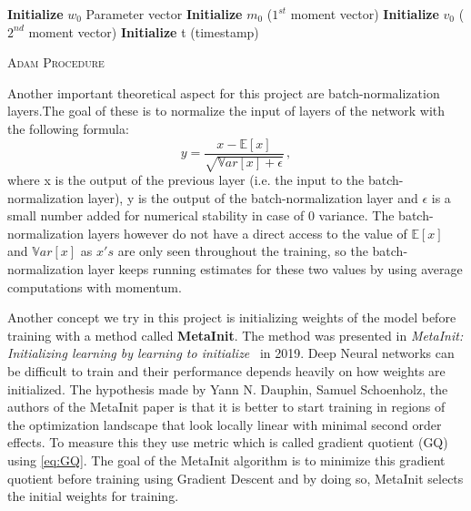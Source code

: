 \documentclass[a4paper,11pt,oneside]{report}
\begin{document}
\begin{algorithm}[H]
    \DontPrintSemicolon
    \SetAlgoNoLine
    
    \KwIn{learning rate $\eta$, exponential decay rates for the moment estimates $\beta_1, \beta_2 \in [0,1)$}
    \textbf{Initialize} $w_0$ Parameter vector\;
    \textbf{Initialize} $m_0$ ($1^{st}$ moment vector)\;
    \textbf{Initialize} $v_0$ ($2^{nd}$ moment vector)\;
    \textbf{Initialize} t (timestamp)\;
    \caption{{\textsc{Adam Procedure}}}
    \label{algo:Adam}
\end{algorithm}


Another important theoretical aspect for this project are batch-normalization layers.The goal of these is to normalize the input of layers of the network with the following formula:
\begin{equation}\label{eq:BN}
    y = \frac{x-\mathbb{E}[x]}{\sqrt{\mathbb{V}ar[x]+\epsilon}}\,,
\end{equation}
where x is the output of the previous layer (i.e. the input to the batch-normalization layer), y is the output of the batch-normalization layer and $\epsilon$ is a small number added for numerical stability in case of 0 variance. The batch-normalization layers however do not have a direct access to the value of $\mathbb{E}[x]$ and $\mathbb{V}ar[x]$ as $x's$ are only seen throughout the training, so the batch-normalization layer keeps running estimates for these two values by using average computations with momentum. 

Another concept we try in this project is initializing weights of the model before training with a method called \textbf{MetaInit}. The method was presented in \textit{MetaInit: Initializing learning by learning to initialize}~\cite{NEURIPS2019_876e8108} in 2019. Deep Neural networks can be difficult to train and their performance depends heavily on how weights are initialized. The hypothesis made by Yann N. Dauphin, Samuel Schoenholz, the authors of the MetaInit paper is that it is better to start training in regions of the optimization landscape that look locally linear with minimal second order effects. To measure this they use metric which is called gradient quotient (GQ) using \autoref{eq:GQ}. The goal of the MetaInit algorithm is to minimize this gradient quotient before training using Gradient Descent and by doing so, MetaInit selects the initial weights for training.
\end{document}
